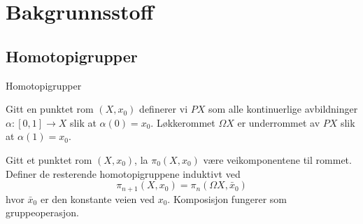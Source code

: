 \documentclass[UKenglish]{beamer}
\begin{document}
\section{Bakgrunnsstoff}

\subsection{Homotopigrupper}


\begin{frame}{Homotopigrupper}
    \begin{definition}[Veirom]
       Gitt en punktet rom \( (X, x_0) \) definerer vi \( PX \) som
       alle kontinuerlige avbildninger \( \alpha:[0,1]\rightarrow X \)
       slik at \( \alpha(0)=x_0 \). Løkkerommet \( \Omega X \) er
       underrommet av \( PX \) slik at \( \alpha(1)=x_0 \).
    \end{definition}
    \begin{definition}[]
    Gitt et punktet rom \( (X, x_0) \), la \( \pi_0(X, x_0) \) 
    være veikomponentene til rommet. Definer de resterende homotopigruppene
    induktivt ved
    \begin{equation}
        \pi_{n+1}(X, x_0) = \pi_n(\Omega X, \bar{x}_0)
    \end{equation}
    hvor \( \bar{x}_0 \) 
    er den konstante veien ved \( x_0 \). Komposisjon fungerer
    som gruppeoperasjon.
    \end{definition}

    
\end{frame}

\end{document}
